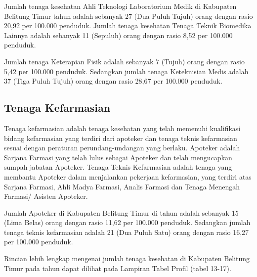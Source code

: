 Jumlah tenaga kesehatan Ahli Teknologi Laboratorium Medik di Kabupaten Belitung Timur tahun
\tP adalah sebanyak 27 (Dua Puluh Tujuh) orang dengan rasio 20,92 per 100.000 penduduk.
Jumlah tenaga kesehatan Tenaga Teknik Biomedika Lainnya adalah sebanyak 11 (Sepuluh) orang dengan rasio 8,52 per 100.000 penduduk.

Jumlah tenaga Keterapian Fisik adalah sebanyak 7 (Tujuh) orang dengan rasio 5,42 per 100.000 penduduk. Sedangkan jumlah tenaga Keteknisian Medis adalah 37 (Tiga Puluh Tujuh) orang dengan rasio 28,67 per 100.000 penduduk.


\subsection{Tenaga Kefarmasian}
Tenaga kefarmasian adalah tenaga kesehatan yang telah memenuhi kualifikasi bidang kefarmasian yang terdiri dari apoteker dan tenaga teknis kefarmasian sesuai dengan peraturan perundang-undangan yang berlaku.
Apoteker adalah Sarjana Farmasi yang telah lulus sebagai Apoteker dan telah mengucapkan sumpah jabatan Apoteker.
Tenaga Teknis Kefarmasian adalah tenaga yang membantu Apoteker dalam menjalankan pekerjaan kefarmasian, yang terdiri atas Sarjana Farmasi, Ahli Madya Farmasi, Analis Farmasi dan Tenaga Menengah Farmasi/ Asisten Apoteker.

Jumlah Apoteker di Kabupaten Belitung Timur di tahun \tP adalah sebanyak 15 (Lima Belas) orang dengan rasio 11,62 per 100.000 penduduk. Sedangkan jumlah tenaga teknis kefarmasian adalah 21 (Dua Puluh Satu) orang dengan rasio 16,27 per 100.000 penduduk.

\vspace{2ex}

Rincian lebih lengkap mengenai jumlah tenaga kesehatan di Kabupaten Belitung Timur pada tahun \tP dapat dilihat pada Lampiran Tabel Profil (tabel 13-17).
